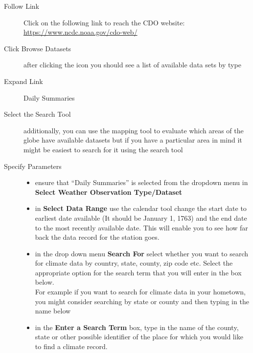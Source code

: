\documentclass{article}\usepackage[]{graphicx}\usepackage[]{color}
\begin{document}
\begin{description}
  \item[Follow Link] Click on the following link to reach the CDO website: \\ \url{https://www.ncdc.noaa.gov/cdo-web/} 
  \item[Click Browse Datasets] after clicking the icon you should see a list of available data sets by type
  \item[Expand Link] Daily Summaries
  \item[Select the Search Tool] additionally, you can use the mapping tool to evaluate which areas of the globe have available datasets but if you have a particular area in mind it might be easiest to search for it using the search tool
  \item[Specify Parameters] \hspace{30mm}
    \begin{itemize}
    \item ensure that ``Daily Summaries'' is selected from the dropdown menu in \textbf{Select Weather Observation Type/Dataset}
    \item in \textbf{Select Data Range} use the calendar tool change the start date to earliest date available (It should be January 1, 1763) and the end date to the most recently available date. This will enable you to see how far back the data record for the station goes.  
    \item in the drop down menu \textbf{Search For} select whether you want to search for climate data by country, state, county, zip code etc. Select the appropriate option for the search term that you will enter in the box below. \\ For example if you want to search for climate data in your hometown, you might consider searching by state or county and then typing in the name below
    \item in the \textbf{Enter a Search Term} box, type in the name of the county, state or other possible identifier of the place for which you would like to find a climate record.
    \end{itemize}


\end{description}
\end{document}
